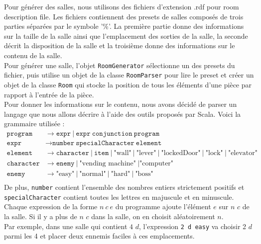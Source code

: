 \documentclass[10pt,a4paper]{article}
\begin{document}
Pour générer des salles, nous utilisons des fichiers d'extension .rdf pour room description file. Les fichiers contiennent des presets de salles composés de trois parties séparées par le symbole '\%'. La première partie donne des informations sur la taille de la salle ainsi que l'emplacement des sorties de la salle, la seconde décrit la disposition de la salle et la troisième donne des informations sur le contenu de la salle.\\
Pour générer une salle, l'objet \texttt{RoomGenerator} sélectionne un des presets du fichier, puis utilise un objet de la classe \texttt{RoomParser} pour lire le preset et créer un objet de la classe \texttt{Room} qui stocke la position de tous les éléments d'une pièce par rapport à l'entrée de la pièce.\\
Pour donner les informations sur le contenu, nous avons décidé de parser un langage que nous allons décrire à l'aide des outils proposés par Scala. Voici la grammaire utilisée :\\
\begin{align*}
	\texttt{program}   & \to \texttt{expr}\ |\ \texttt{expr}\ \texttt{conjunction}\ \texttt{program}                                                                   \\
	\texttt{expr}      & \to \texttt{number}\ \texttt{specialCharacter}\ \texttt{element}                                                                              \\
	\texttt{element}   & \to \texttt{character}\ |\ \texttt{item}\ |\ \mbox{"wall"}\ |\ \mbox{"lever"}\ |\ \mbox{"lockedDoor"}\ |\ \mbox{"lock"}\ |\ \mbox{"elevator"} \\
	\texttt{character} & \to \texttt{enemy}\ |\ \mbox{"vending machine"}\ | \mbox{"computer"}                                                                          \\
	\texttt{enemy}     & \to \mbox{"easy"}\ |\ \mbox{"normal"}\ |\ \mbox{"hard"}\ |\ \mbox{"boss"}                                                                     \\
\end{align*}
De plus, \texttt{number} contient l'ensemble des nombres entiers strictement positifs et \texttt{specialCharacter} contient toutes les lettres en majuscule et en minuscule.\\
Chaque expression de la forme $n\ c\ e$ du programme ajoute l'élément $e$ sur $n$ $c$ de la salle. Si il y a plus de $n$ $c$ dans la salle, on en choisit aléatoirement $n$.\\
Par exemple, dans une salle qui contient $4$ $d$, l'expression \texttt{2 d easy} va choisir 2 $d$ parmi les 4 et placer deux ennemis faciles à ces emplacements.\\
\end{document}
